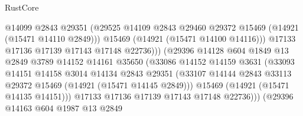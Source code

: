 \begin{lexlean}{RustCore}
\begin{coremodule}
                                      @14099
                                      @2843
                                      @29351
                                      (@29525
                                        @14109
                                        @2843
                                        @29460
                                        @29372
                                        @15469
                                        (@14921 (@15471 @14110 @2849)))
                                      @15469
                                      (@14921 (@15471 @14100 @14116)))
                                    @17133
                                    @17136
                                    @17139
                                    @17143
                                    @17148
                                    @22736)))
                              (@29396
                                @14128
                                @604
                                @1849
                                @13
                                @2849
                                @3789
                                @14152
                                @14161
                                @35650
                                (@33086
                                  @14152
                                  @14159
                                  @3631
                                  (@33093
                                    @14151
                                    @14158
                                    @3014
                                    @14134
                                    @2843
                                    @29351
                                    (@33107
                                      @14144
                                      @2843
                                      @33113
                                      @29372
                                      @15469
                                      (@14921 (@15471 @14145 @2849)))
                                    @15469
                                    (@14921 (@15471 @14135 @14151)))
                                  @17133
                                  @17136
                                  @17139
                                  @17143
                                  @17148
                                  @22736)))
                            (@29396
                              @14163
                              @604
                              @1987
                              @13
                              @2849

\end{coremodule}
\end{lexlean}
